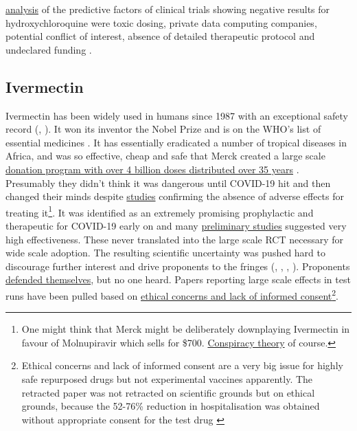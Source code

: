 \documentclass[11pt,a4paper,notitlepage]{report}
\begin{document}
\href{https://www.researchgate.net/publication/358676854_Predictive_factors_of_clinical_assays_on_hydroxychloroquine_for_COVID-19_mortality_during_the_first_year_of_the_pandemic_A_meta-synthesis}{analysis} of the predictive factors of clinical trials showing negative results for hydroxychloroquine were toxic dosing, private data computing companies, potential conflict of interest, absence of detailed therapeutic protocol and undeclared funding \cite{million2022}.


\subsection*{Ivermectin}

Ivermectin has been widely used in humans since 1987 with an exceptional safety record (\cite{Smit2016-fq}, \cite{Crump2011-ev}). It won its inventor the Nobel Prize and is on the WHO’s list of essential medicines \cite{Crump2017-qg}. It has essentially eradicated a number of tropical diseases in Africa, and was so effective, cheap and safe that Merck created a large scale \href{https://www.merck.com/stories/mectizan/}{donation program with over 4 billion doses distributed over 35 years} \cite{merck06012021}. Presumably they didn't think it was dangerous until COVID-19 hit and then changed their minds despite \href{https://academic.oup.com/ofid/article/8/Supplement_1/S365/6450290}{studies} \cite{wentzel2021} confirming the absence of adverse effects for treating it\footnote{One might think that Merck might be deliberately downplaying Ivermectin in favour of Molnupiravir which sells  for \$700. \href{https://www.bloomberg.com/news/articles/2021-12-08/merck-s-mrk-covid-pill-must-first-overcome-anti-vax-ivermectin-misinformation}{Conspiracy theory} of course.}. It was identified as an extremely promising prophylactic and therapeutic for COVID-19 early on and many \href{https://c19ivermectin.com/}{preliminary studies} suggested very high effectiveness. These never translated into the large scale RCT necessary for wide scale adoption. The resulting scientific uncertainty was pushed hard to discourage further interest and drive proponents to the fringes (\cite{bbc06102021}, \cite{guardian13092021}, \cite{guardian24092021}, \cite{guardian24092021b}). Proponents \href{https://bird-group.org/the-bbcs-recent-article-false-science-is-disintegrating-under-scrutiny/}{defended themselves}, but no one heard. Papers reporting large scale effects in test runs have been pulled based on \href{https://healthpolicy-watch.news/mexico-city-officials-in-row-over-misleading-paper-to-justify-its-ivermectin-drive/}{ethical concerns and lack of informed consent}\footnote{Ethical concerns and lack of informed consent are a very big issue for highly safe repurposed drugs but not experimental vaccines apparently. The retracted paper was not retracted on scientific grounds but on ethical grounds, because the 52-76\% reduction in hospitalisation was obtained without appropriate consent for the test drug \cite{bmj22022022}}. 
\end{document}
